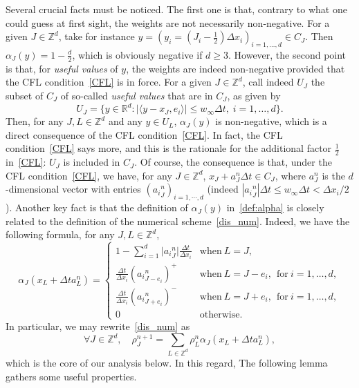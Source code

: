 \documentclass[11pt]{article}
\theoremstyle{definition}
\numberwithin{equation}{section}
\newcommand*\RR{\mathbb{R}}
\newcommand*\ZZ{\mathbb{Z}}
\let\oldforall\forall
\renewcommand*{\forall}{\mathrel{\oldforall}}
\begin{document}
Several crucial facts must be noticed. The first one is that, contrary to what one could guess at first sight, the weights are not necessarily non-negative. For a given $J \in \ZZ^d$, take for instance $y=(y_{i}=(J_{i}-\tfrac12) \Delta x_{i})_{i=1,\dots,d}\in C_{J}$. Then $\alpha_{J}(y) = 1 - \tfrac{d}{2}$, which is obviously negative if $d\geq 3$. However, the second point is that, for \emph{useful values} of $y$, the weights are indeed non-negative provided that the CFL condition~\eqref{CFL} is in force. For a given $J \in \ZZ^d$, call indeed $U_{J}$ the subset of $C_{J}$ of so-called \emph{useful values} that are in $C_{J}$, as given by
\begin{equation*}
U_{J} = \{ y \in \RR^d : \vert \langle y - x_{J},e_{i} \rangle \vert \leq w_{\infty} \Delta t, \; i = 1,\dots,d \}.
\end{equation*}
Then, for any $J,L \in \ZZ^d$ and any $y \in U_{L}$, $\alpha_{J}(y)$ is non-negative, which is a direct consequence of the CFL condition~\eqref{CFL}. In fact, the CFL condition~\eqref{CFL} says more, and this is the rationale for the additional factor $\tfrac12$ in~\eqref{CFL}: $U_{J}$ is included in $C_{J}$. Of course, the consequence is that, under the CFL condition~\eqref{CFL}, we have, for any $J\in\ZZ^d$, $x_J+a_J^n\Delta t \in C_J$, where $a^n_{J}$ is the $d$-dimensional vector with entries $({a_i}^n_{J})_{i=1,\cdots,d}$ (indeed $|{a_{i}}_J^n| \Delta t \leq w_\infty \Delta t < \Delta x_i/2$). Another key fact is that the definition of $\alpha_{J}(y)$ in~\eqref{def:alpha} is closely related to the definition of the numerical scheme~\eqref{dis_num}. Indeed, we have the following formula, for any $J,L \in {\mathbb Z}^d$,
\begin{equation}\label{eq:transition:probas}
\alpha_{J} (x_{L} + \Delta t a^n_{L}
) =
\begin{cases}
 1-\sum_{i=1}^d \vert {a_{i}}^n_{J} \vert \frac{\Delta t}{\Delta x_i} & \text{when} \ L=J,
\\[0.25em]
 \frac{\Delta t}{\Delta x_i}({a_{i}}^n_{J-e_{i}} )^{+} &\text{when} \ L = J-e_{i}, \ \ \text{for} \ i= 1,\dots,d,
\\[0.25em]
 \frac{\Delta t}{\Delta x_i}({a_{i}}^n_{J+e_{i}} )^{-} &\text{when} \ L = J+e_{i}, \ \ \text{for} \ i= 1,\dots,d,
\\[0.25em]
0 &\text{otherwise}.
\end{cases}
\end{equation}
In particular, we may rewrite~\eqref{dis_num} as
\begin{equation}\label{scheme3}
\forall J \in \ZZ^d, \quad \rho^{n+1}_J = \sum_{L\in\ZZ^d} \rho^n_L \alpha_{J}(x_L+\Delta t a^n_L),
\end{equation}
which is the core of our analysis below. In this regard, The following lemma gathers some useful properties.
\end{document}
